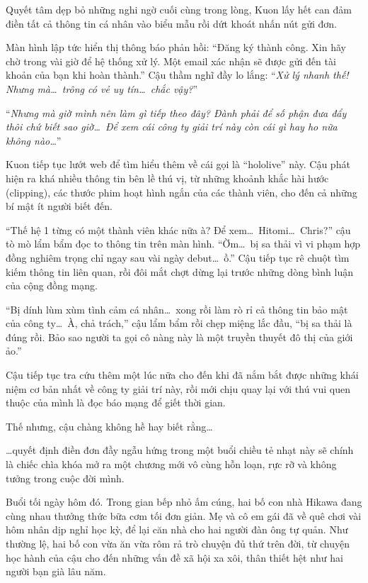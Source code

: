 \documentclass[../main.tex]{subfiles}
\begin{document}
Quyết tâm dẹp bỏ những nghi ngờ cuối cùng trong lòng, Kuon lấy hết can đảm điền tất cả thông tin cá nhân vào biểu mẫu rồi dứt khoát nhấn nút gửi đơn.

Màn hình lập tức hiển thị thông báo phản hồi: ``Đăng ký thành công. Xin hãy chờ trong vài giờ để hệ thống xử lý. Một email xác nhận sẽ được gửi đến tài khoản của bạn khi hoàn thành.'' Cậu thầm nghĩ đầy lo lắng: ``\textit{Xử lý nhanh thế! Nhưng mà\dots\ trông có vẻ uy tín\dots\ chắc vậy?}''

``\textit{Nhưng mà giờ mình nên làm gì tiếp theo đây? Đành phải để số phận đưa đẩy thôi chứ biết sao giờ\dots\ Để xem cái công ty giải trí này còn cái gì hay ho nữa không nào\dots}''

Kuon tiếp tục lướt web để tìm hiểu thêm về cái gọi là ``hololive'' này. Cậu phát hiện ra khá nhiều thông tin bên lề thú vị, từ những khoảnh khắc hài hước (clipping), các thước phim hoạt hình ngắn của các thành viên, cho đến cả những bí mật ít người biết đến.

``Thế hệ 1 từng có một thành viên khác nữa à? Để xem\dots\ Hitomi\dots\ Chris?'' cậu tò mò lẩm bẩm đọc to thông tin trên màn hình. ``Ờm\dots\ bị sa thải vì vi phạm hợp đồng nghiêm trọng chỉ ngay sau vài ngày debut\dots\ ồ.'' Cậu tiếp tục rê chuột tìm kiếm thông tin liên quan, rồi đôi mắt chợt dừng lại trước những dòng bình luận của cộng đồng mạng.

``Bị dính lùm xùm tình cảm cá nhân\dots\ xong rồi làm rò rỉ cả thông tin bảo mật của công ty\dots\ À, chả trách,'' cậu lẩm bẩm rồi chẹp miệng lắc đầu, ``bị sa thải là đúng rồi. Bảo sao người ta gọi cô nàng này là một truyền thuyết đô thị của giới ảo.''

Cậu tiếp tục tra cứu thêm một lúc nữa cho đến khi đã nắm bắt được những khái niệm cơ bản nhất về công ty giải trí này, rồi mới chịu quay lại với thú vui quen thuộc của mình là đọc báo mạng để giết thời gian.

Thế nhưng, cậu chàng không hề hay biết rằng\dots

\dots quyết định điền đơn đầy ngẫu hứng trong một buổi chiều tẻ nhạt này sẽ chính là chiếc chìa khóa mở ra một chương mới vô cùng hỗn loạn, rực rỡ và không tưởng trong cuộc đời mình.

\ct

Buổi tối ngày hôm đó. Trong gian bếp nhỏ ấm cúng, hai bố con nhà Hikawa đang cùng nhau thưởng thức bữa cơm tối đơn giản. Mẹ và cô em gái đã về quê chơi vài hôm nhân dịp nghỉ học kỳ, để lại căn nhà cho hai người đàn ông tự quản. Như thường lệ, hai bố con vừa ăn vừa rôm rả trò chuyện đủ thứ trên đời, từ chuyện học hành của cậu cho đến những vấn đề xã hội xa xôi, thân thiết hệt như hai người bạn già lâu năm.
\end{document}
